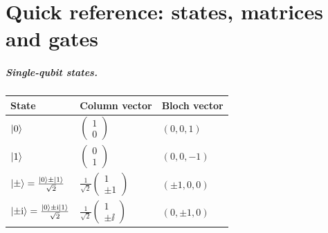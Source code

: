 \chapter{Quick reference: states, matrices and gates}\label{app:reference}

\paragraph{Single-qubit states.}
\begin{center}
\small
\begin{tabular}{@{}lll@{}}
  \toprule
  State & Column vector & Bloch vector\\
  \midrule
  $\left|0\right\rangle$ & $\begin{pmatrix}1\\0\end{pmatrix}$ & $(0,0,1)$\\[6pt]
  $\left|1\right\rangle$ & $\begin{pmatrix}0\\1\end{pmatrix}$ & $(0,0,-1)$\\[6pt]
  $\left|\pm\right\rangle=\frac{\left|0\right\rangle\pm\left|1\right\rangle}{\sqrt2}$ & $\frac1{\sqrt2}\begin{pmatrix}1\\\pm1\end{pmatrix}$ & $(\pm1,0,0)$\\[6pt]
  $\left|\pm\mathrm{i}\right\rangle=\frac{\left|0\right\rangle\pm\mathrm{i}\left|1\right\rangle}{\sqrt2}$ & $\frac1{\sqrt2}\begin{pmatrix}1\\\pm\ii\end{pmatrix}$ & $(0,\pm1,0)$\\
  \bottomrule
\end{tabular}
\end{center}

